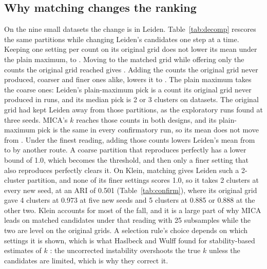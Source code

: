

\subsection{Why matching changes the ranking}\label{sec:why}
On the nine small datasets the change is in Leiden. Table~\ref{tab:decomp} rescores the same partitions while changing Leiden's
candidates one step at a time. Keeping one setting per count on its original grid does not lower its mean
under the plain maximum,  to . Moving to the matched grid
while offering only the counts the original grid reached gives . Adding the counts
the original grid never produced, coarser and finer ones alike, lowers it to . The plain
maximum takes the coarse ones: Leiden's plain-maximum pick is a count its original grid never produced in
 runs, and its median pick is 2 or 3 clusters on 
datasets. The original grid had kept Leiden away from those partitions, as the exploratory runs found at three seeds. MICA's $k$ reaches those counts in both designs, and its plain-maximum pick is the same in every confirmatory run, so its mean does not move from .
Under the finest reading, adding those counts lowers Leiden's mean from  to
 by another route. A coarse partition that reproduces perfectly has a lower bound of 1.0, which
becomes the threshold, and then only a finer setting that also reproduces perfectly clears it. On Klein, matching gives Leiden such a 2-cluster partition, and none of its finer settings scores 1.0, so it takes 2 clusters at every new seed, at an ARI of 0.501 (Table~\ref{tab:confirm}), where its original grid gave 4 clusters at 0.973 at five new seeds and 5 clusters at 0.885 or 0.888 at the other two. Klein accounts for most of the fall, and
it is a large part of why MICA leads on matched candidates under that reading with 25 subsamples while the
two are level on the original grids. A selection rule's choice depends on which settings it is
shown, which is what Haslbeck and Wulff found for stability-based estimates of $k$
\cite{Haslbeck2020Corrected}: the uncorrected instability overshoots the true $k$ unless the candidates are limited, which is why they correct it.

